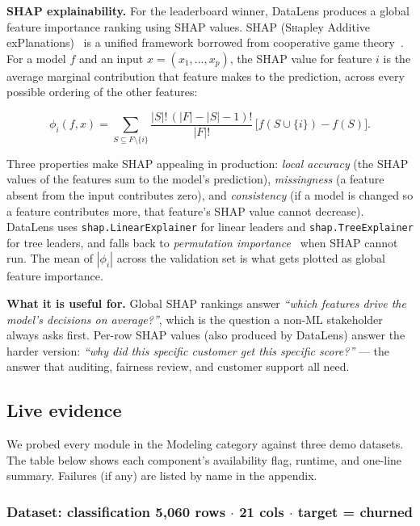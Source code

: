 \documentclass[11pt,a4paper]{article}
\begin{document}
\textbf{SHAP explainability.} For the leaderboard winner, DataLens produces a global feature importance ranking using SHAP values. SHAP (\textsc{Sh}apley \textsc{A}dditive ex\textsc{P}lanations)~\cite{lundberg2017shap} is a unified framework borrowed from cooperative game theory~\cite{shapley1953}. For a model $f$ and an input $x = (x_1, \dots, x_p)$, the SHAP value for feature $i$ is the average marginal contribution that feature makes to the prediction, across every possible ordering of the other features:

$$\phi_i(f, x) = \sum_{S \subseteq F \setminus \{i\}} \frac{|S|! \, (|F| - |S| - 1)!}{|F|!} \, \bigl[ f(S \cup \{i\}) - f(S) \bigr].$$

Three properties make SHAP appealing in production: \emph{local accuracy} (the SHAP values of the features sum to the model's prediction), \emph{missingness} (a feature absent from the input contributes zero), and \emph{consistency} (if a model is changed so a feature contributes more, that feature's SHAP value cannot decrease). DataLens uses \texttt{shap.LinearExplainer} for linear leaders and \texttt{shap.TreeExplainer} for tree leaders, and falls back to \emph{permutation importance}~\cite{breiman2001rf} when SHAP cannot run. The mean of $|\phi_i|$ across the validation set is what gets plotted as global feature importance.

\textbf{What it is useful for.} Global SHAP rankings answer \emph{``which features drive the model's decisions on average?''}, which is the question a non-ML stakeholder always asks first. Per-row SHAP values (also produced by DataLens) answer the harder version: \emph{``why did this specific customer get this specific score?''} --- the answer that auditing, fairness review, and customer support all need.

\subsection{Live evidence}

We probed every module in the Modeling category against three
demo datasets. The table below shows each component's availability flag,
runtime, and one-line summary. Failures (if any) are listed by name in the
appendix.


\subsubsection*{Dataset: classification
\hfill {\color{ink3}\footnotesize 5,060 rows
{$\boldsymbol{\cdot}$} 21 cols
{$\boldsymbol{\cdot}$} target = churned}}
\end{document}
